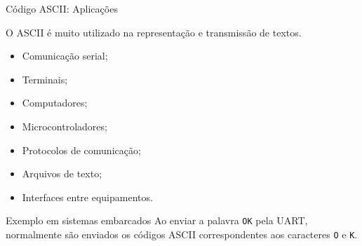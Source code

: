 \begin{frame}{Código ASCII: Aplicações}
    \small

    O ASCII é muito utilizado na representação e transmissão
    de textos.

    \begin{itemize}
        \item Comunicação serial;
        \item Terminais;
        \item Computadores;
        \item Microcontroladores;
        \item Protocolos de comunicação;
        \item Arquivos de texto;
        \item Interfaces entre equipamentos.
    \end{itemize}

    \vspace{0.3cm}

    \begin{block}{Exemplo em sistemas embarcados}
        Ao enviar a palavra \texttt{OK} pela UART, normalmente são
        enviados os códigos ASCII correspondentes aos caracteres
        \texttt{O} e \texttt{K}.
    \end{block}

\end{frame}
